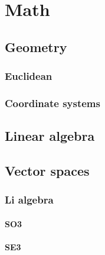 \chapter{Math}

\section{Geometry}
    \subsection{Euclidean}
        \subsection{Coordinate systems}
        
    
    
    \section{Linear algebra}
\section{Vector spaces}
    \subsection{Li algebra}
        \subsubsection{SO3}
        \subsubsection{SE3}
        